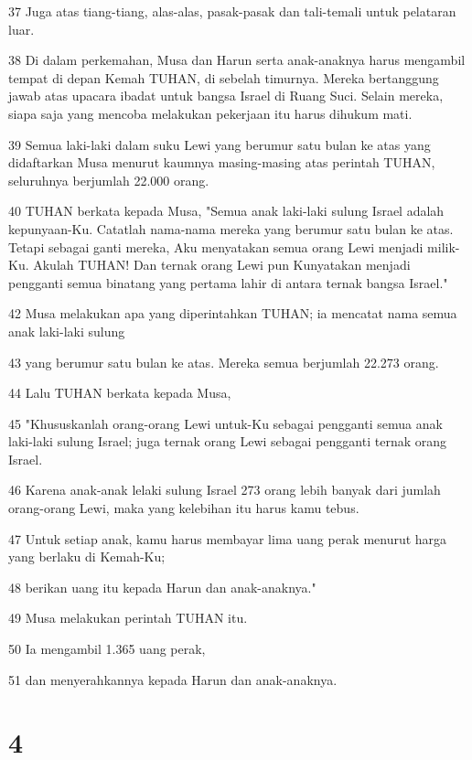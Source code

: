 \par 37 Juga atas tiang-tiang, alas-alas, pasak-pasak dan tali-temali untuk pelataran luar.
\par 38 Di dalam perkemahan, Musa dan Harun serta anak-anaknya harus mengambil tempat di depan Kemah TUHAN, di sebelah timurnya. Mereka bertanggung jawab atas upacara ibadat untuk bangsa Israel di Ruang Suci. Selain mereka, siapa saja yang mencoba melakukan pekerjaan itu harus dihukum mati.
\par 39 Semua laki-laki dalam suku Lewi yang berumur satu bulan ke atas yang didaftarkan Musa menurut kaumnya masing-masing atas perintah TUHAN, seluruhnya berjumlah 22.000 orang.
\par 40 TUHAN berkata kepada Musa, "Semua anak laki-laki sulung Israel adalah kepunyaan-Ku. Catatlah nama-nama mereka yang berumur satu bulan ke atas. Tetapi sebagai ganti mereka, Aku menyatakan semua orang Lewi menjadi milik-Ku. Akulah TUHAN! Dan ternak orang Lewi pun Kunyatakan menjadi pengganti semua binatang yang pertama lahir di antara ternak bangsa Israel."
\par 42 Musa melakukan apa yang diperintahkan TUHAN; ia mencatat nama semua anak laki-laki sulung
\par 43 yang berumur satu bulan ke atas. Mereka semua berjumlah 22.273 orang.
\par 44 Lalu TUHAN berkata kepada Musa,
\par 45 "Khususkanlah orang-orang Lewi untuk-Ku sebagai pengganti semua anak laki-laki sulung Israel; juga ternak orang Lewi sebagai pengganti ternak orang Israel.
\par 46 Karena anak-anak lelaki sulung Israel 273 orang lebih banyak dari jumlah orang-orang Lewi, maka yang kelebihan itu harus kamu tebus.
\par 47 Untuk setiap anak, kamu harus membayar lima uang perak menurut harga yang berlaku di Kemah-Ku;
\par 48 berikan uang itu kepada Harun dan anak-anaknya."
\par 49 Musa melakukan perintah TUHAN itu.
\par 50 Ia mengambil 1.365 uang perak,
\par 51 dan menyerahkannya kepada Harun dan anak-anaknya.

\chapter{4}

